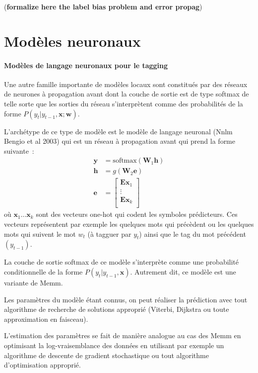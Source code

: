 \documentclass[11pt,openany]{book}
\begin{document}
({\bf formalize here the label bias problem and error propag})

\section{Modèles neuronaux}

\paragraph{Modèles de langage neuronaux pour le tagging} Une autre famille importante de modèles locaux sont constitués par des réseaux de neurones à propagation avant dont
la couche de sortie est de type softmax de telle sorte que les sorties du réseau s'interprètent comme des probabilités de la forme
$P(y_t|y_{t-1},\mathbf{x};\mathbf{w})$.

L'archétype de ce type de modèle est le modèle de langage neuronal
({\sc Nnlm} Bengio et al 2003) qui est un réseau à propagation avant qui prend la
forme suivante~:
\begin{align}
\mathbf{y} &= \text{softmax}(\mathbf{W}_1 \mathbf{h})\\
\mathbf{h} &= g(\mathbf{W}_2\mathbf{e})\\
\mathbf{e} &= \left [ 
\begin{array}{c}
\mathbf{E} \mathbf{x}_1\\
\vdots\\
\mathbf{E} \mathbf{x}_k\\
\end{array}\right]
\end{align}
où $\mathbf{x}_1 \ldots \mathbf{x}_k$  sont des vecteurs one-hot qui
codent les symboles prédicteurs. Ces vecteurs représentent par
exemple les quelques mots qui précèdent ou les quelques mots qui suivent le mot $w_t$ (à
tagguer par $y_t$) ainsi que le tag du mot précédent $(y_{t-1})$.

La couche de sortie softmax de ce modèle s'interprète comme une
probabilité conditionnelle de la forme $P(y_t |
y_{t-1},\mathbf{x})$. Autrement dit, ce modèle est une variante de
{\sc Memm}.

Les paramètres du modèle étant connus, on peut réaliser la prédiction avec tout algorithme de recherche de solutions approprié
(Viterbi, Dijkstra ou toute approximation en faisceau).

L'estimation des paramètres se fait de manière analogue au cas des
{\sc Memm} en optimisant la log-vraisemblance des données en utilisant par exemple un algorithme de descente
de gradient stochastique ou tout algorithme d'optimisation approprié.
\end{document}
